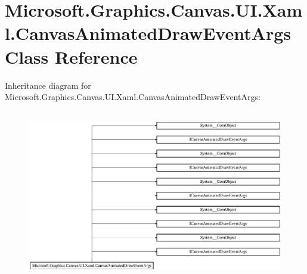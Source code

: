 \hypertarget{class_microsoft_1_1_graphics_1_1_canvas_1_1_u_i_1_1_xaml_1_1_canvas_animated_draw_event_args}{}\section{Microsoft.\+Graphics.\+Canvas.\+U\+I.\+Xaml.\+Canvas\+Animated\+Draw\+Event\+Args Class Reference}
\label{class_microsoft_1_1_graphics_1_1_canvas_1_1_u_i_1_1_xaml_1_1_canvas_animated_draw_event_args}
Inheritance diagram for Microsoft.\+Graphics.\+Canvas.\+U\+I.\+Xaml.\+Canvas\+Animated\+Draw\+Event\+Args\+:\begin{figure}[H]
\begin{center}
\leavevmode
\includegraphics[height=7.512195cm]{class_microsoft_1_1_graphics_1_1_canvas_1_1_u_i_1_1_xaml_1_1_canvas_animated_draw_event_args}
\end{center}
\end{figure}

